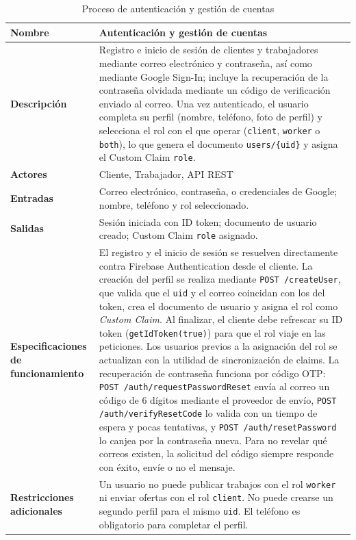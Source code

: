 \documentclass[doc,12pt,a4paper]{apa7}
\begin{document}
\begin{longtable}{|P{3.3cm}|L{11.2cm}|}
\caption{Proceso de autenticación y gestión de cuentas}\\
\hline
\textbf{Nombre} & Autenticación y gestión de cuentas \\ \hline
\textbf{Descripción} & Registro e inicio de sesión de clientes y trabajadores mediante correo electrónico y contraseña, así como mediante Google Sign-In; incluye la recuperación de la contraseña olvidada mediante un código de verificación enviado al correo. Una vez autenticado, el usuario completa su perfil (nombre, teléfono, foto de perfil) y selecciona el rol con el que operar (\texttt{client}, \texttt{worker} o \texttt{both}), lo que genera el documento \texttt{users/\{uid\}} y asigna el Custom Claim \texttt{role}. \\ \hline
\textbf{Actores} & Cliente, Trabajador, API REST \\ \hline
\textbf{Entradas} & Correo electrónico, contraseña, o credenciales de Google; nombre, teléfono y rol seleccionado. \\ \hline
\textbf{Salidas} & Sesión iniciada con ID token; documento de usuario creado; Custom Claim \texttt{role} asignado. \\ \hline
\textbf{Especificaciones de funcionamiento} & El registro y el inicio de sesión se resuelven directamente contra Firebase Authentication desde el cliente. La creación del perfil se realiza mediante \texttt{POST /createUser}, que valida que el \texttt{uid} y el correo coincidan con los del token, crea el documento de usuario y asigna el rol como \textit{Custom Claim}. Al finalizar, el cliente debe refrescar su ID token (\texttt{getIdToken(true)}) para que el rol viaje en las peticiones. Los usuarios previos a la asignación del rol se actualizan con la utilidad de sincronización de claims. La recuperación de contraseña funciona por código OTP: \texttt{POST /auth/requestPasswordReset} envía al correo un código de 6 dígitos mediante el proveedor de envío, \texttt{POST /auth/verifyResetCode} lo valida con un tiempo de espera y pocas tentativas, y \texttt{POST /auth/resetPassword} lo canjea por la contraseña nueva. Para no revelar qué correos existen, la solicitud del código siempre responde con éxito, envíe o no el mensaje. \\ \hline
\textbf{Restricciones adicionales} & Un usuario no puede publicar trabajos con el rol \texttt{worker} ni enviar ofertas con el rol \texttt{client}. No puede crearse un segundo perfil para el mismo \texttt{uid}. El teléfono es obligatorio para completar el perfil. \\ \hline
\end{longtable}
\end{document}
